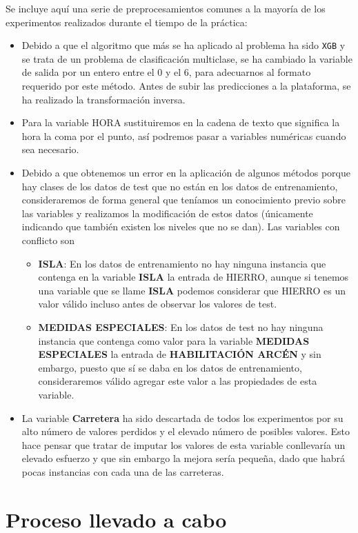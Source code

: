 \documentclass[11pt]{article}
\begin{document}
Se incluye aquí una serie de preprocesamientos comunes a la mayoría de
los experimentos realizados durante el tiempo de la práctica:
\begin{itemize}
\item Debido a que el algoritmo que más se ha aplicado al problema ha sido
\texttt{XGB} y se trata de un problema de clasificación multiclase, se ha
cambiado la variable de salida por un entero entre el 0 y el 6, para
adecuarnos al formato requerido por este método. Antes de subir las
predicciones a la plataforma, se ha realizado la transformación
inversa.
\item Para la variable HORA sustituiremos en la cadena de texto que
significa la hora la coma por el punto, así podremos pasar a
variables numéricas cuando sea necesario.
\item Debido a que obtenemos un error en la aplicación de algunos métodos
porque hay clases de los datos de test que no están en los datos de
entrenamiento, consideraremos de forma general que teníamos un
conocimiento previo sobre las variables y realizamos la modificación
de estos datos (únicamente indicando que también existen
los niveles que no se dan). Las variables con conflicto son 
\begin{itemize}
\item \textbf{ISLA}: En los datos de entrenamiento no hay ninguna instancia que
contenga en la variable \textbf{ISLA} la entrada de HIERRO, aunque si
tenemos una variable que se llame \textbf{ISLA} podemos considerar que
HIERRO es un valor válido incluso antes de observar los valores de
test.
\item \textbf{MEDIDAS ESPECIALES}: En los datos de test no hay ninguna instancia
que contenga como valor para la variable \textbf{MEDIDAS ESPECIALES} la
entrada de \textbf{HABILITACIÓN ARCÉN} y sin embargo, puesto que sí se daba
en los datos de entrenamiento, consideraremos válido agregar este
valor a las propiedades de esta variable.
\end{itemize}
\item La variable \textbf{Carretera} ha sido descartada de todos los experimentos
por su alto número de valores perdidos y el elevado número de
posibles valores. Esto hace pensar que tratar de imputar los valores
de esta variable conllevaría un elevado esfuerzo y que sin embargo
la mejora sería pequeña, dado que habrá pocas instancias con cada
una de las carreteras.
\end{itemize}

\section{Proceso llevado a cabo}
\label{sec:org74b95c1}
\end{document}

